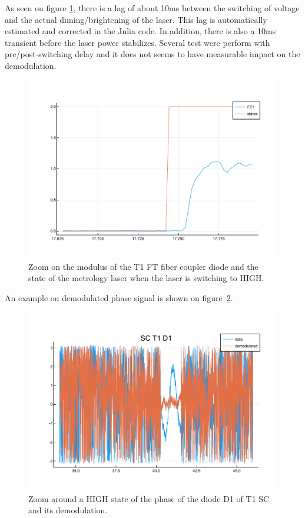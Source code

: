 \documentclass[a4paper,11pt,twoside]{scrartcl}
\begin{document}
As seen on figure \ref{fig:faintzoom}, there is a lag of about 10ms between the switching of voltage and the actual diming/brightening of the laser. This lag is automatically estimated and corrected in the Julia code. 
In addition, there is also a 10ms transient before the laser power stabilizes. Several test were perform with pre/post-switching delay and it does not seems to have measurable impact on the demodulation.
\begin{figure}
    \centering
    \includegraphics[width=0.6\linewidth]{figs/FaintStatesZoom.pdf}
    \caption{Zoom on the modulus of the T1 FT fiber coupler diode and the state of the metrology laser when the laser is switching to HIGH.}
    \label{fig:faintzoom}
\end{figure}

An example on demodulated phase signal is shown on figure~\ref{fig:FaintDemodulated}.
\begin{figure}
    \centering
    \includegraphics[width=0.8\linewidth]{figs/FaintDemodulated.pdf}
    \caption{Zoom around a HIGH state of the phase of the diode D1 of T1 SC and its demodulation.}
    \label{fig:FaintDemodulated}
\end{figure}
\end{document}
